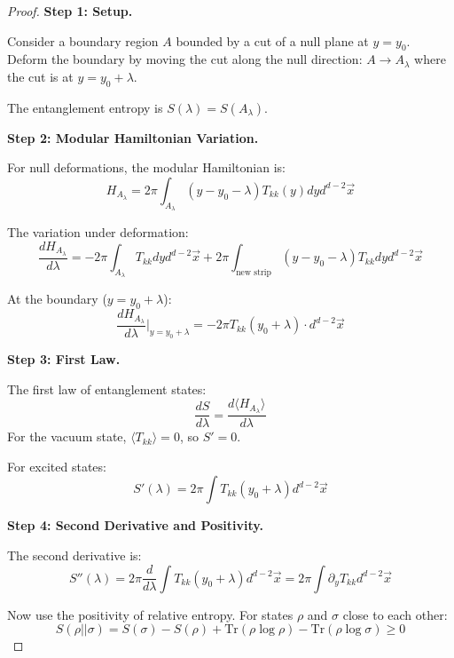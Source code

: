 \documentclass[12pt,a4paper]{article}
\begin{document}
\begin{proof}
\textbf{Step 1: Setup.}

Consider a boundary region $A$ bounded by a cut of a null plane at $y = y_0$. Deform the boundary by moving the cut along the null direction: $A \to A_\lambda$ where the cut is at $y = y_0 + \lambda$.

The entanglement entropy is $S(\lambda) = S(A_\lambda)$.

\textbf{Step 2: Modular Hamiltonian Variation.}

For null deformations, the modular Hamiltonian is:
\begin{equation}
H_{A_\lambda} = 2\pi \int_{A_\lambda} (y - y_0 - \lambda) T_{kk}(y) dy d^{d-2}\vec{x}
\end{equation}

The variation under deformation:
\begin{equation}
\frac{dH_{A_\lambda}}{d\lambda} = -2\pi \int_{A_\lambda} T_{kk} dy d^{d-2}\vec{x} + 2\pi \int_{\text{new strip}} (y - y_0 - \lambda) T_{kk} dy d^{d-2}\vec{x}
\end{equation}

At the boundary ($y = y_0 + \lambda$):
\begin{equation}
\frac{dH_{A_\lambda}}{d\lambda}\Big|_{y = y_0 + \lambda} = -2\pi T_{kk}(y_0 + \lambda) \cdot d^{d-2}\vec{x}
\end{equation}

\textbf{Step 3: First Law.}

The first law of entanglement states:
\begin{equation}
\frac{dS}{d\lambda} = \frac{d\langle H_{A_\lambda}\rangle}{d\lambda}
\end{equation}
For the vacuum state, $\langle T_{kk}\rangle = 0$, so $S' = 0$.

For excited states:
\begin{equation}
S'(\lambda) = 2\pi \int T_{kk}(y_0 + \lambda) d^{d-2}\vec{x}
\end{equation}

\textbf{Step 4: Second Derivative and Positivity.}

The second derivative is:
\begin{equation}
S''(\lambda) = 2\pi \frac{d}{d\lambda}\int T_{kk}(y_0 + \lambda) d^{d-2}\vec{x} = 2\pi \int \partial_y T_{kk} d^{d-2}\vec{x}
\end{equation}

Now use the positivity of relative entropy. For states $\rho$ and $\sigma$ close to each other:
\begin{equation}
S(\rho||\sigma) = S(\sigma) - S(\rho) + \text{Tr}(\rho \log\rho) - \text{Tr}(\rho\log\sigma) \geq 0
\end{equation}


\end{proof}
\end{document}
